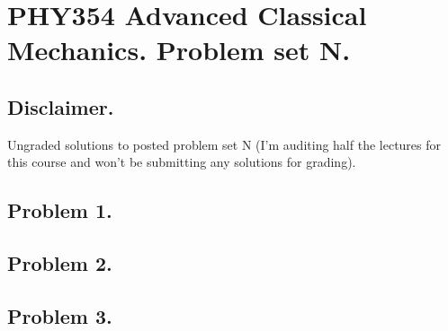 
%

\chapter{PHY354 Advanced Classical Mechanics.  Problem set {N}.}
\label{chap:classicalMechanicsPs1}
{}
\date{Feb XX, 2012}

\beginArtWithToc

\section{Disclaimer.}

Ungraded solutions to posted problem set {N} (I'm auditing half the lectures for this course and won't be submitting any solutions for grading).

\section{Problem 1.}
\section{Problem 2.}
\section{Problem 3.}

\EndNoBibArticle
